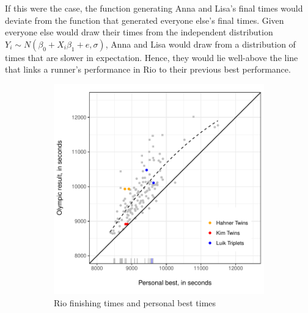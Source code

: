 \documentclass[12pt,titlepage]{article}
\begin{document}
If this were the case, the function generating Anna and Lisa's final times would deviate from the function that generated everyone else's final times.  Given everyone else would draw their times from the independent distribution  $Y_i \sim N(\beta_0 + X_{i}\beta_1 + e, \sigma)$,  Anna and Lisa would draw from a distribution of times that are slower in expectation. Hence, they would lie well-above the line that links a runner's performance in Rio to their previous best performance.    

\begin{figure}[!ht]
  \caption{Relationship between Personal Best and Result  -- caption?}
  \label{fig:scatter}
  \begin{subfigure}{.5\textwidth}
    \centering
    \includegraphics[width=\textwidth, keepaspectratio]{scatter_plot.pdf}
    \caption{Rio finishing times and personal best times}
    \label{fig:45degreeplot}
  \end{subfigure}
  \begin{subfigure}{.5\textwidth}
    \centering

\end{subfigure}
\end{figure}
\end{document}
